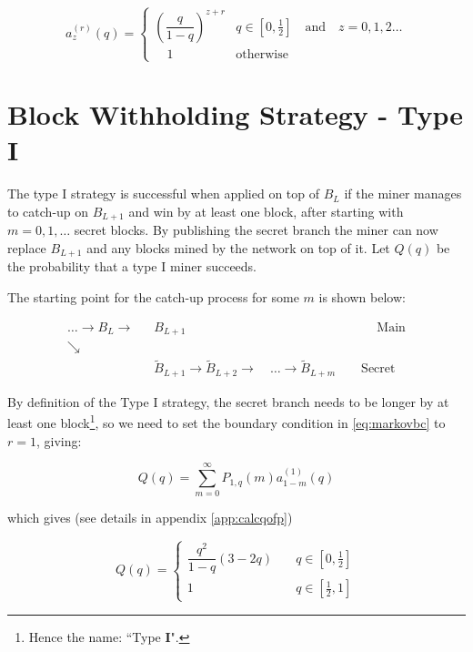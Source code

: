 \documentclass[letterpaper,12pt]{report}
\theoremstyle{plain}
\theoremstyle{definition}
\begin{document}
\begin{equation}\label{eq:az}
\mathit{a}^{(r)}_z(q)=\begin{cases}\left( \dfrac{q}{1-q}\right)^{z+r} & q\in [0,\frac{1}{2}] \quad \mathrm{and} \quad z=0,1,2\dots \\ \quad 1 & \mathrm{otherwise} \end{cases}
\end{equation}

\section{Block Withholding Strategy - Type I}

The type I strategy is successful when applied on top of $\mathit{B}_L$ if the miner manages to catch-up on $B_{L+1}$ and win by at least one block, after starting with $m=0,1,\dots$ secret blocks. 
By publishing the secret branch the miner can now replace $\mathit{B}_{L+1}$ and any blocks mined by the network on top of it. 
Let $\mathit{Q}(q)$ be the probability that a type I miner succeeds. 

The starting point for the catch-up process for some $m$ is shown below:

\begin{eqnarray}\label{blockwithholdingboundary}
 \dots \rightarrow \mathit{B}_L\rightarrow &\mathit{B}_{L+1} \qquad\qquad\qquad\qquad\qquad\qquad\qquad\quad \mathrm{Main}\\\nonumber
\searrow & \\\nonumber
\qquad \qquad \qquad & \widetilde{\mathit{B}}_{L+1}\rightarrow\widetilde{\mathit{B}}_{L+2}
\longrightarrow \quad \dots \longrightarrow\widetilde{\mathit{B}}_{L+m}\qquad \mathrm{Secret}
\end{eqnarray}

By definition of the Type I strategy, the secret branch needs to be longer by at least one block\footnote{Hence the name: ``Type \textbf{I}".}, so we need to set the boundary condition in \ref{eq:markovbc} to $r=1$, giving: 

\begin{equation}\label{eq:qofpdef}
\mathit{Q}(q)=\sum_{m=0}^{\infty}\mathit{P}_{1,q}(m)\mathit{a}^{(1)}_{1-m}(q)
\end{equation}

which gives (see details in appendix \ref{app:calcqofp})

\begin{equation}\label{eq:qofp}
\mathit{Q}(q)=
\begin{cases}
\dfrac{q^2}{1-q}\left(3-2q\right) & \quad q \in [0,\frac{1}{2}] \\
1 & \quad q \in [\frac{1}{2},1] 
\end{cases}
\end{equation}
\end{document}
